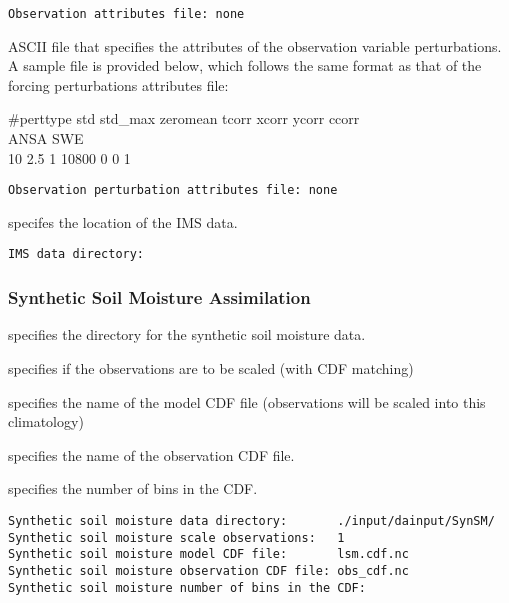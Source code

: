  

 \begin{Verbatim}[frame=single]
Observation attributes file: none
 \end{Verbatim}

 
  ASCII file that
 specifies the attributes of the observation variable perturbations. 
 A sample file is provided below, which follows the same format 
 as that of the forcing perturbations attributes file: 

 \#perttype  std    std\_max   zeromean  tcorr  xcorr ycorr ccorr \\
 \indent ANSA SWE                                                 \\
      10      2.5        1        10800       0    0    1 
 

 \begin{Verbatim}[frame=single]
Observation perturbation attributes file: none
 \end{Verbatim}

 
  specifes the location of the IMS data.
 

 \begin{Verbatim}[frame=single]
IMS data directory:
 \end{Verbatim}

 
 
 \subsubsection{Synthetic Soil Moisture Assimilation}
 \label{sssec:syntheticsm}
 

 
  specifies the
 directory for the synthetic soil moisture data.

  specifies if the
 observations are to be scaled (with CDF matching)

  specifies the name
 of the model CDF file (observations will be scaled into this
 climatology)

  specifies the name
 of the observation CDF file.

 specifies the number of bins in the CDF.
 

 \begin{Verbatim}[frame=single]
Synthetic soil moisture data directory:       ./input/dainput/SynSM/
Synthetic soil moisture scale observations:   1
Synthetic soil moisture model CDF file:       lsm.cdf.nc
Synthetic soil moisture observation CDF file: obs_cdf.nc
Synthetic soil moisture number of bins in the CDF:
 \end{Verbatim}
 

